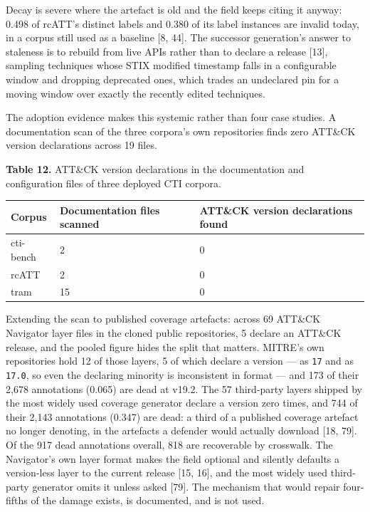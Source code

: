 \documentclass[11pt,a4paper]{article}
\begin{document}
Decay is severe where the artefact is old and the field keeps citing it anyway: 0.498 of rcATT's distinct labels and 0.380 of its label instances are invalid today, in a corpus still used as a baseline [8, 44]. The successor generation's answer to staleness is to rebuild from live APIs rather than to declare a release [13], sampling techniques whose STIX modified timestamp falls in a configurable window and dropping deprecated ones, which trades an undeclared pin for a moving window over exactly the recently edited techniques.

The adoption evidence makes this systemic rather than four case studies. A documentation scan of the three corpora's own repositories finds zero ATT\&CK version declarations across 19 files.

\textbf{Table 12.} ATT\&CK version declarations in the documentation and configuration files of three deployed CTI corpora.

\begin{center}\footnotesize
\begin{tabular}{lll}
\toprule
Corpus & Documentation files scanned & ATT\&CK version declarations found \\
\midrule
cti-bench & 2 & 0 \\
rcATT & 2 & 0 \\
tram & 15 & 0 \\
\bottomrule
\end{tabular}
\end{center}
Extending the scan to published coverage artefacts: across 69 ATT\&CK Navigator layer files in the cloned public repositories, 5 declare an ATT\&CK release, and the pooled figure hides the split that matters. MITRE's own repositories hold 12 of those layers, 5 of which declare a version — as \texttt{17} and as \texttt{17.0}, so even the declaring minority is inconsistent in format — and 173 of their 2,678 annotations (0.065) are dead at v19.2. The 57 third-party layers shipped by the most widely used coverage generator declare a version zero times, and 744 of their 2,143 annotations (0.347) are dead: a third of a published coverage artefact no longer denoting, in the artefacts a defender would actually download [18, 79]. Of the 917 dead annotations overall, 818 are recoverable by crosswalk. The Navigator's own layer format makes the field optional and silently defaults a version-less layer to the current release [15, 16], and the most widely used third-party generator omits it unless asked [79]. The mechanism that would repair four-fifths of the damage exists, is documented, and is not used.
\end{document}

